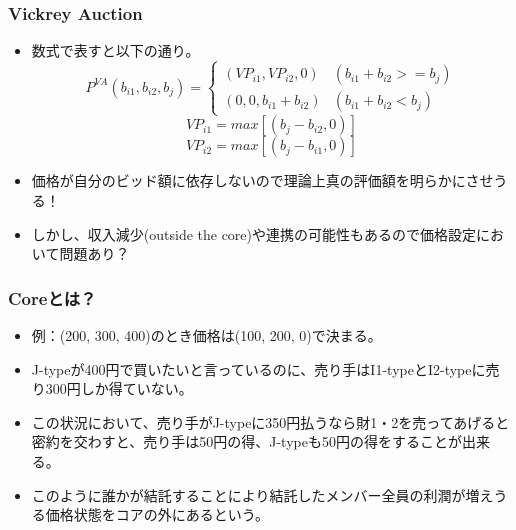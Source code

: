 \documentclass[dvipdfmx,12pt]{beamer}
\begin{document}
\begin{frame}
\frametitle{Vickrey Auction}
\begin{itemize}\setlength{\parskip}{0.5em}
\item
数式で表すと以下の通り。
\begin{equation}
  P^{VA}(b_{i1}, b_{i2}, b_{j}) = \begin{cases}
    (VP_{i1}, VP_{i2}, 0) & (b_{i1} + b_{i2} >= b_{j}) \\
    (0, 0, b_{i1} + b_{i2}) & (b_{i1} + b_{i2} < b_{j})
  \end{cases}
\end{equation}
\begin{equation}
  VP_{i1} = max[(b_{j} - b_{i2}, 0)]
\end{equation}
\begin{equation}
  VP_{i2} = max[(b_{j} - b_{i1}, 0)]
\end{equation}
\pause
\item
価格が自分のビッド額に依存しないので理論上真の評価額を明らかにさせうる！\pause
\item
しかし、収入減少(outside the core)や連携の可能性もあるので価格設定において問題あり？
\end{itemize}
\end{frame}

\begin{frame}
\frametitle{Coreとは？}
\begin{itemize}\setlength{\parskip}{0.5em}
\item
例：(200, 300, 400)のとき価格は(100, 200, 0)で決まる。\pause
\item
J-typeが400円で買いたいと言っているのに、売り手はI1-typeとI2-typeに売り300円しか得ていない。\pause
\item
この状況において、売り手がJ-typeに350円払うなら財1・2を売ってあげると密約を交わすと、売り手は50円の得、J-typeも50円の得をすることが出来る。\pause
\item
このように誰かが結託することにより結託したメンバー全員の利潤が増えうる価格状態をコアの外にあるという。
\end{itemize}
\end{frame}
\end{document}
